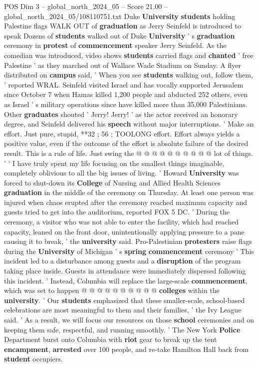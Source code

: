\begin{textsample}{POS Dim 3 – global\_north\_2024\_05 – Score 21.00 – global\_north\_2024\_05/108110751.txt}  \label{ex:f3_pos_020}
Duke \textbf{University} \textbf{students} holding Palestine flags WALK OUT of \textbf{graduation} as Jerry Seinfeld is introduced to speak Dozens of \textbf{students} walked out of Duke \textbf{University} ' s \textbf{graduation} ceremony in \textbf{protest} of \textbf{commencement} speaker Jerry Seinfeld.
As the comedian was introduced, video shows \textbf{students} carried flags and \textbf{chanted} ' free Palestine ' as they marched out of Wallace Wade Stadium on Sunday.
A flyer distributed on \textbf{campus} said, ' When you see \textbf{students} walking out, follow them, ' reported WRAL.
Seinfeld visited Israel and has vocally supported Jerusalem since October 7 when Hamas killed 1,200 people and abducted 252 others, even as Israel ' s military operations since have killed more than 35,000 Palestinians.
Other \textbf{graduates} shouted ' Jerry!
Jerry! ' as the actor received an honorary degree, and Seinfeld delivered his \textbf{speech} without major interruptions. ' Make an effort.
Just pure, stupid, **32 ; 56 ; TOOLONG effort.
Effort always yields a positive value, even if the outcome of the effort is absolute failure of the desired result.
This is a rule of life.
Just swing the @ @ @ @ @ @ @ @ @ @ lot of things. ' ' I have truly spent my life focusing on the smallest things imaginable, completely oblivious to all the big issues of living. ' Howard \textbf{University} was forced to shut-down its \textbf{College} of Nursing and Allied Health Sciences \textbf{graduation} in the middle of the ceremony on Thursday.
At least one person was injured when chaos erupted after the ceremony reached maximum capacity and guests tried to get into the auditorium, reported FOX 5 DC. ' During the ceremony, a visitor who was not able to enter the facility, which had reached capacity, leaned on the front door, unintentionally applying pressure to a pane causing it to break, ' the \textbf{university} said.
Pro-Palestinian \textbf{protesters} raise flags during the \textbf{University} of Michigan ' s \textbf{spring} \textbf{commencement} ceremony ' This incident led to a disturbance among guests and a \textbf{disruption} of the program taking place inside.
Guests in attendance were immediately dispersed following this incident. ' Instead, Columbia will replace the large-scale \textbf{commencement}, which was set to happen @ @ @ @ @ @ @ @ @ @ \textbf{colleges} within the \textbf{university}. ' Our \textbf{students} emphasized that these smaller-scale, school-based celebrations are most meaningful to them and their families, ' the Ivy League said. ' As a result, we will focus our resources on those \textbf{school} ceremonies and on keeping them safe, respectful, and running smoothly. ' The New York \textbf{Police} Department burst onto Columbia with \textbf{riot} gear to break up the tent \textbf{encampment}, \textbf{arrested} over 100 people, and re-take Hamilton Hall back from \textbf{student} occupiers.

\end{textsample}
